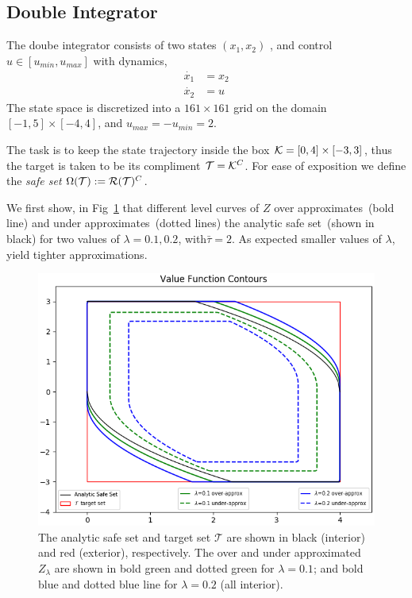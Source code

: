 \subsection{Double Integrator}
The doube integrator consists of two states $(x_1, x_2)$ , and  control $u \in [u_{min}, u_{max}]$ with dynamics,
\begin{equation}
\begin{split}
\dot{x_1} & = x_2 \\
\dot{x_2} & = u 
\end{split}
\end{equation}
\noindent The state space is discretized into a $161 \times 161$ grid on the domain $[-1,5] \times [-4,4]$, and $u_{max}=-u_{min}=2$.

The task is to keep the state trajectory inside the box $\mathcal{K} = [0,4] \times [-3,3]$, thus the target is taken to be its compliment $\mathcal{T}=\mathcal{K}^C$. For ease of exposition we define the \emph{safe set} $\Omega(\mathcal{T}) := \mathcal{R}(\mathcal{T})^C$.

We first show, in Fig~\ref{fig:convergence} that different level curves of $Z$ over approximates~(bold line) and under approximates~(dotted lines) the analytic safe set~(shown in black) for two values of $\lambda = 0.1, 0.2$, with$\bar{\tau}=2$. As expected smaller values of $\lambda$, yield tighter approximations. 

\begin{figure}
\includegraphics[scale=0.5]{convergence_difflambda.png}
\caption{The analytic safe set and target set $\mathcal{T}$ are shown in black (interior) and red (exterior), respectively. The over and under approximated $Z_{\lambda}$ are shown in bold green and dotted green for $\lambda=0.1$; and bold blue and dotted blue line for $\lambda  = 0.2$ (all interior).}
\label{fig:convergence}
\end{figure}

